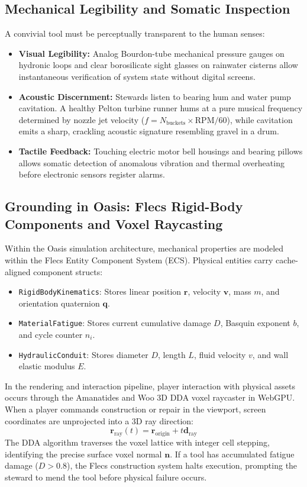 \subsection{Mechanical Legibility and Somatic Inspection}
A convivial tool must be perceptually transparent to the human senses:
\begin{itemize}
    \item \textbf{Visual Legibility:} Analog Bourdon-tube mechanical pressure gauges on hydronic loops and clear borosilicate sight glasses on rainwater cisterns allow instantaneous verification of system state without digital screens.
    \item \textbf{Acoustic Discernment:} Stewards listen to bearing hum and water pump cavitation. A healthy Pelton turbine runner hums at a pure musical frequency determined by nozzle jet velocity ($f = N_{\mathrm{buckets}} \times \mathrm{RPM} / 60$), while cavitation emits a sharp, crackling acoustic signature resembling gravel in a drum.
    \item \textbf{Tactile Feedback:} Touching electric motor bell housings and bearing pillows allows somatic detection of anomalous vibration and thermal overheating before electronic sensors register alarms.
\end{itemize}

\subsection{Grounding in Oasis: Flecs Rigid-Body Components and Voxel Raycasting}
Within the Oasis simulation architecture, mechanical properties are modeled within the Flecs Entity Component System (ECS). Physical entities carry cache-aligned component structs:
\begin{itemize}
    \item \texttt{RigidBodyKinematics}: Stores linear position $\mathbf{r}$, velocity $\mathbf{v}$, mass $m$, and orientation quaternion $\mathbf{q}$.
    \item \texttt{MaterialFatigue}: Stores current cumulative damage $D$, Basquin exponent $b$, and cycle counter $n_i$.
    \item \texttt{HydraulicConduit}: Stores diameter $D$, length $L$, fluid velocity $v$, and wall elastic modulus $E$.
\end{itemize}

In the rendering and interaction pipeline, player interaction with physical assets occurs through the Amanatides and Woo 3D DDA voxel raycaster in WebGPU. When a player commands construction or repair in the viewport, screen coordinates are unprojected into a 3D ray direction:
\begin{equation}
\mathbf{r}_{\mathrm{ray}}(t) = \mathbf{r}_{\mathrm{origin}} + t \mathbf{d}_{\mathrm{ray}}
\label{eq:ray_equation}
\end{equation}
The DDA algorithm traverses the voxel lattice with integer cell stepping, identifying the precise surface voxel normal $\mathbf{n}$. If a tool has accumulated fatigue damage ($D > 0.8$), the Flecs construction system halts execution, prompting the steward to mend the tool before physical failure occurs.

